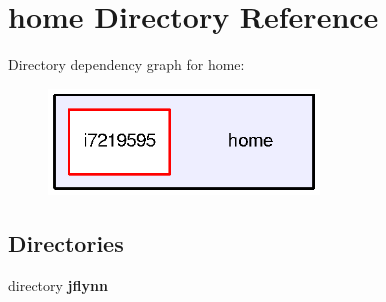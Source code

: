 \section{home Directory Reference}
\label{dir_75b82e7e4a5feb05200b9ad7adf06257}
Directory dependency graph for home\-:\nopagebreak
\begin{figure}[H]
\begin{center}
\leavevmode
\includegraphics[width=204pt]{dir_75b82e7e4a5feb05200b9ad7adf06257_dep}
\end{center}
\end{figure}
\subsection*{Directories}
\begin{DoxyCompactItemize}
\item 
directory {\bf jflynn}
\end{DoxyCompactItemize}
